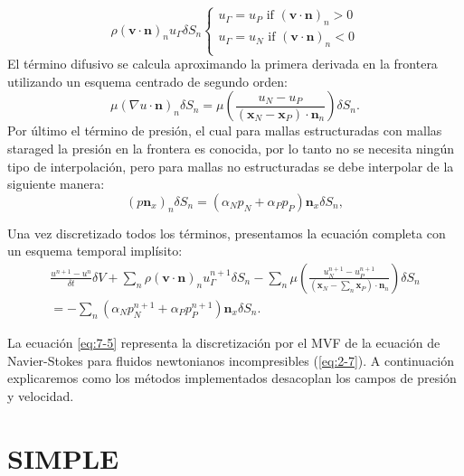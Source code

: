 \documentclass[a4paper,10pt, oneside]{book}
\begin{document}
\begin{equation}
	\rho (\mathbf{v} \cdot \mathbf{n})_n u_\Gamma \delta S_n   
	\left\lbrace
	\begin{array}{l}
		u_\Gamma = u_P \text{ if }  (\mathbf{v} \cdot \mathbf{n})_n > 0\\
		u_\Gamma = u_N \text{ if }  (\mathbf{v} \cdot \mathbf{n})_n < 0\\
	\end{array}
	\right. \nonumber
\end{equation}
El término difusivo se calcula aproximando la primera derivada en la frontera utilizando un esquema centrado de segundo orden:
\begin{equation}
	\mu ( \nabla u \cdot \mathbf{n} )_n  \delta S_n = \mu \left( \frac{u_N - u_P}{(\mathbf{x}_N - \mathbf{x}_P) \cdot \mathbf{n}_n } \right) \delta S_n. \nonumber
\end{equation}
Por último el término de presión, el cual para mallas estructuradas con mallas staraged la presión en la frontera es conocida, por lo tanto no se necesita ningún tipo de interpolación, pero para mallas no estructuradas se debe interpolar de la siguiente manera:
\begin{equation}
	( p \mathbf{n}_x )_n \delta S_n = (\alpha_N p_N + \alpha_P p_P) \mathbf{n}_x \delta S_n, \nonumber
\end{equation}

Una vez discretizado todos los términos, presentamos la ecuación completa con un esquema temporal implísito:
\begin{eqnarray}
	\frac{u^{n+1} - u^n}{\delta t} \delta V + \sum_n \rho (\mathbf{v} \cdot \mathbf{n})_n u_\Gamma^{n+1} \delta S_n - \sum_n \mu \left( \frac{u_N^{n+1} - u_P^{n+1}}{(\mathbf{x}_N - \sum_n \mathbf{x}_P) \cdot \mathbf{n}_n } \right) \delta S_n \nonumber \\
	= - \sum_n (\alpha_N p_N^{n+1} + \alpha_P p_P^{n+1}) \mathbf{n}_x \delta S_n.
	\label{eq:7-5}
\end{eqnarray}

La ecuación \ref{eq:7-5} representa la discretización por el MVF de la ecuación de Navier-Stokes para fluidos newtonianos incompresibles (\ref{eq:2-7}). A continuación explicaremos como los métodos implementados desacoplan los campos de presión y velocidad.


\section{SIMPLE}
\end{document}
